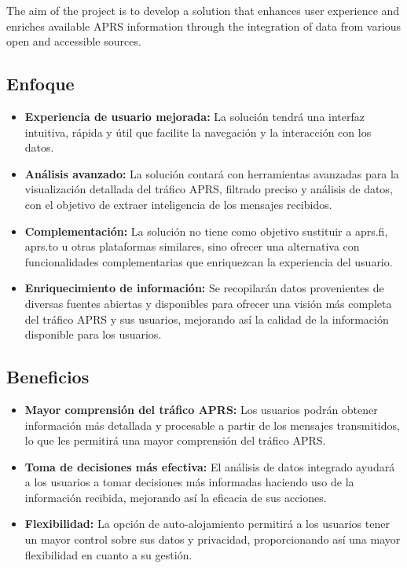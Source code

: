 The aim of the project is to develop a solution that enhances user experience and enriches available APRS information through the integration of data from various open and accessible sources.

\subsection{Enfoque}

\begin{itemize}
    \item \textbf{Experiencia de usuario mejorada:} La solución tendrá una interfaz intuitiva, rápida y útil que facilite la navegación y la interacción con los datos.
    
    \item \textbf{Análisis avanzado:} La solución contará con herramientas avanzadas para la visualización detallada del tráfico APRS, filtrado preciso y análisis de datos, con el objetivo de extraer inteligencia de los mensajes recibidos.
    
    \item \textbf{Complementación:} La solución no tiene como objetivo sustituir a aprs.fi, aprs.to u otras plataformas similares, sino ofrecer una alternativa con funcionalidades complementarias que enriquezcan la experiencia del usuario.
    
    \item \textbf{Enriquecimiento de información:} Se recopilarán datos provenientes de diversas fuentes abiertas y disponibles para ofrecer una visión más completa del tráfico APRS y sus usuarios, mejorando así la calidad de la información disponible para los usuarios.
\end{itemize}

\subsection{Beneficios}

\begin{itemize}
    \item \textbf{Mayor comprensión del tráfico APRS:} Los usuarios podrán obtener información más detallada y procesable a partir de los mensajes transmitidos, lo que les permitirá una mayor comprensión del tráfico APRS.
    
	\item \textbf{Toma de decisiones más efectiva:} El análisis de datos integrado ayudará a los usuarios a tomar decisiones más informadas haciendo uso de la información recibida, mejorando así la eficacia de sus acciones.
    
    \item \textbf{Flexibilidad:} La opción de auto-alojamiento permitirá a los usuarios tener un mayor control sobre sus datos y privacidad, proporcionando así una mayor flexibilidad en cuanto a su gestión.
\end{itemize}

